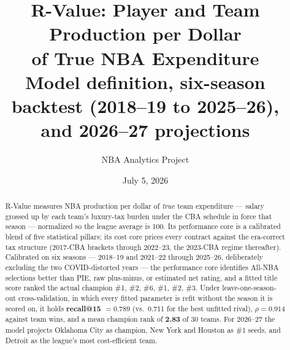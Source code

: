 \documentclass[11pt]{article}
\title{\textbf{R-Value: Player and Team Production per Dollar\\ of True NBA Expenditure}\\[6pt]
\large Model definition, six-season backtest (2018--19 to 2025--26),\\
and 2026--27 projections}
\author{NBA Analytics Project}
\date{July 5, 2026}
\begin{document}
\maketitle

\begin{abstract}
\noindent
R-Value measures NBA production per dollar of \emph{true} team expenditure ---
salary grossed up by each team's luxury-tax burden under the CBA schedule in
force that season --- normalized so the league average is 100. Its performance
core is a calibrated blend of five statistical pillars; its cost core prices
every contract against the era-correct tax structure (2017-CBA brackets through
2022--23, the 2023-CBA regime thereafter). Calibrated on six seasons ---
2018--19 and 2021--22 through 2025--26, deliberately excluding the two
COVID-distorted years --- the performance core identifies All-NBA selections
better than PIE, raw plus-minus, or estimated net rating, and a fitted title
score ranked the actual champion \#1, \#2, \#6, \#1, \#2, \#3. Under
leave-one-season-out cross-validation, in which every fitted parameter is
refit without the season it is scored on, it holds \textbf{recall@15 $=
0.789$} (vs.\ 0.711 for the best unfitted rival), \textbf{$\rho = 0.914$}
against team wins, and a mean champion rank of \textbf{2.83} of 30 teams. For
2026--27 the model projects Oklahoma City as champion, New York and Houston as
\#1 seeds, and Detroit as the league's most cost-efficient team.
\end{abstract}
\end{document}
